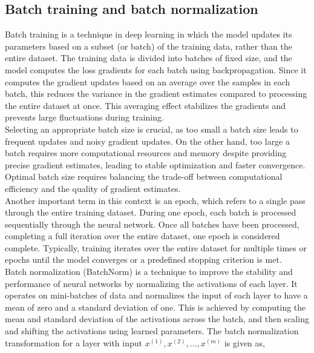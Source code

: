 \subsection{Batch training and batch normalization}
Batch training is a technique in deep learning in which the model updates its parameters based on a subset (or batch) of the training data, rather than the entire dataset. The training data is divided into batches of fixed size, and the model computes the loss gradients for each batch using backpropagation. Since it computes the gradient updates based on an average over the samples in each batch, this reduces the variance in the gradient estimates compared to processing the entire dataset at once. This averaging effect stabilizes the gradients and prevents large fluctuations during training. \\
Selecting an appropriate batch size is crucial, as too small a batch size leads to frequent updates and noisy gradient updates. On the other hand, too large a batch requires more computational resources and memory despite providing precise gradient estimates, leading to stable optimization and faster convergence. Optimal batch size requires balancing the trade-off between computational efficiency and the quality of gradient estimates. \\                     
Another important term in this context is an epoch, which refers to a single pass through the entire training dataset. During one epoch, each batch is processed sequentially through the neural network. Once all batches have been processed, completing a full iteration over the entire dataset, one epoch is considered complete. Typically, training iterates over the entire dataset for multiple times or epochs until the model converges or a predefined stopping criterion is met. \\
Batch normalization (BatchNorm) is a technique to improve the stability and performance of neural networks by normalizing the activations of each layer. It operates on mini-batches of data and normalizes the input of each layer to have a mean of zero and a standard deviation of one. This is achieved by computing the mean and standard deviation of the activations across the batch, and then scaling and shifting the activations using learned parameters. The batch normalization transformation for a layer with input $x^{(1)}, x^{(2)}, \ldots, x^{(m)}$ is given as,
